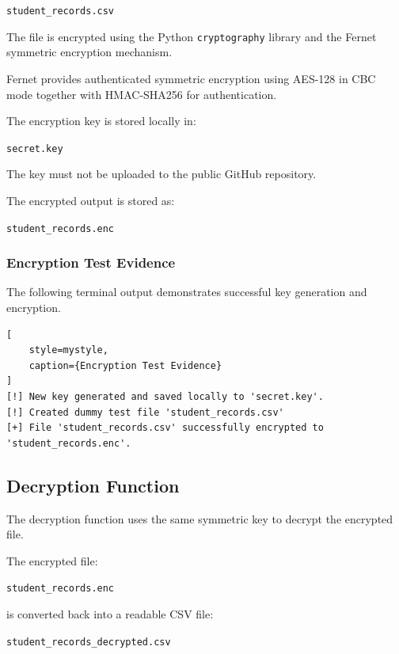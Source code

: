 \documentclass[12pt,a4paper]{article}
\begin{document}
\begin{center}
\texttt{student\_records.csv}
\end{center}

The file is encrypted using the Python \texttt{cryptography} library and the Fernet symmetric encryption mechanism.

Fernet provides authenticated symmetric encryption using AES-128 in CBC mode together with HMAC-SHA256 for authentication.

The encryption key is stored locally in:

\begin{center}
\texttt{secret.key}
\end{center}

The key must not be uploaded to the public GitHub repository.

The encrypted output is stored as:

\begin{center}
\texttt{student\_records.enc}
\end{center}

\subsubsection{Encryption Test Evidence}

The following terminal output demonstrates successful key generation and encryption.

\begin{lstlisting}[
    style=mystyle,
    caption={Encryption Test Evidence}
]
[!] New key generated and saved locally to 'secret.key'.
[!] Created dummy test file 'student_records.csv'
[+] File 'student_records.csv' successfully encrypted to 'student_records.enc'.
\end{lstlisting}

\subsection{Decryption Function}

The decryption function uses the same symmetric key to decrypt the encrypted file.

The encrypted file:

\begin{center}
\texttt{student\_records.enc}
\end{center}

is converted back into a readable CSV file:

\begin{center}
\texttt{student\_records\_decrypted.csv}
\end{center}
\end{document}
